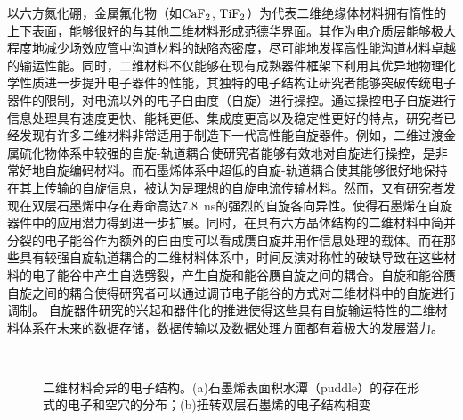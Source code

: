     以六方氮化硼，金属氟化物（如$\rm{CaF_{2}}$, $\rm{TiF_{2}}$）为代表二维绝缘体材料拥有惰性的上下表面，能够很好的与其他二维材料形成范德华界面。其作为电介质层能够极大程度地减少场效应管中沟道材料的缺陷态密度，尽可能地发挥高性能沟道材料卓越的输运性能。同时，二维材料不仅能够在现有成熟器件框架下利用其优异地物理化学性质进一步提升电子器件的性能，其独特的电子结构让研究者能够突破传统电子器件的限制，对电流以外的电子自由度（自旋）进行操控。通过操控电子自旋进行信息处理具有速度更快、能耗更低、集成度更高以及稳定性更好的特点，研究者已经发现有许多二维材料非常适用于制造下一代高性能自旋器件。例如，二维过渡金属硫化物体系中较强的自旋-轨道耦合使研究者能够有效地对自旋进行操控，是非常好地自旋编码材料。而石墨烯体系中超低的自旋-轨道耦合使其能够很好地保持在其上传输的自旋信息，被认为是理想的自旋电流传输材料。然而，又有研究者发现在双层石墨烯中存在寿命高达\SI{7.8}{\nano\second}的强烈的自旋各向异性。使得石墨烯在自旋器件中的应用潜力得到进一步扩展。同时，在具有六方晶体结构的二维材料中简并分裂的电子能谷作为额外的自由度可以看成赝自旋并用作信息处理的载体。而在那些具有较强自旋轨道耦合的二维材料体系中，时间反演对称性的破缺导致在这些材料的电子能谷中产生自选劈裂，产生自旋和能谷赝自旋之间的耦合。自旋和能谷赝自旋之间的耦合使得研究者可以通过调节电子能谷的方式对二维材料中的自旋进行调制。
    自旋器件研究的兴起和器件化的推进使得这些具有自旋输运特性的二维材料体系在未来的数据存储，数据传输以及数据处理方面都有着极大的发展潜力。

    \begin{figure}[htb]
        \\
        \caption{二维材料奇异的电子结构。(a)石墨烯表面积水潭（puddle）的存在形式的电子和空穴的分布；(b)扭转双层石墨烯的电子结构相变}
    \end{figure}

